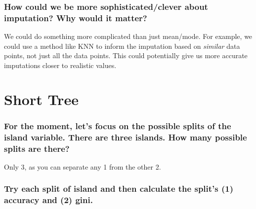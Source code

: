 \documentclass[
]{article}
\begin{document}
\subsubsection{How could we be more sophisticated/clever about
imputation? Why would it
matter?}\label{how-could-we-be-more-sophisticatedclever-about-imputation-why-would-it-matter}

We could do something more complicated than just mean/mode. For example,
we could use a method like KNN to inform the imputation based on
\emph{similar} data points, not just all the data points. This could
potentially give us more accurate imputations closer to realistic
values.

\section{Short Tree}\label{short-tree}

\subsubsection{For the moment, let's focus on the possible splits of the
island variable. There are three islands. How many possible splits are
there?}\label{for-the-moment-lets-focus-on-the-possible-splits-of-the-island-variable.-there-are-three-islands.-how-many-possible-splits-are-there}

Only 3, as you can separate any 1 from the other 2.

\subsubsection{Try each split of island and then calculate the split's
(1) accuracy and (2)
gini.}\label{try-each-split-of-island-and-then-calculate-the-splits-1-accuracy-and-2-gini.}
\end{document}
